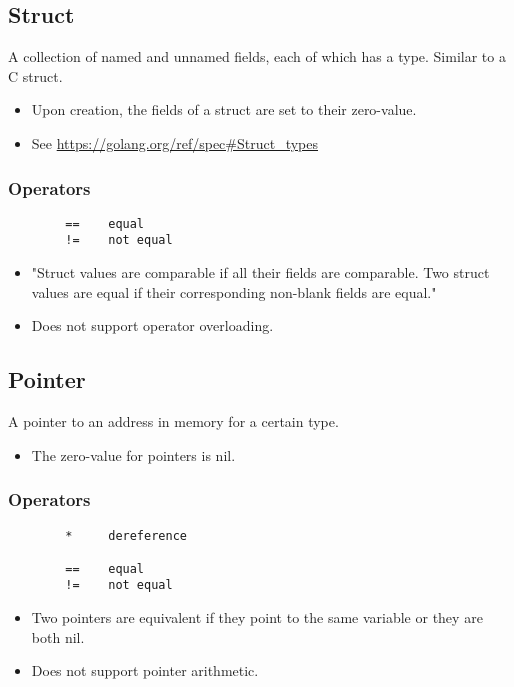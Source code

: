 \documentclass{article}
\begin{document}
	\subsection{Struct}
		A collection of named and unnamed fields, each of which has a type. Similar to a C struct.
		\begin{itemize}
			\item Upon creation, the fields of a struct are set to their zero-value. 
			\item See \url{https://golang.org/ref/spec#Struct_types}
		\end{itemize}
		\subsubsection{Operators}
			\begin{verbatim}
	    ==    equal
	    !=    not equal
			\end{verbatim}
			\begin{itemize}
				\item "Struct values are comparable if all their fields are comparable. Two struct values are equal if their corresponding non-blank fields are equal."
				\item Does not support operator overloading. 
			\end{itemize}
		
	\subsection{Pointer}
		A pointer to an address in memory for a certain type. 
		\begin{itemize}
			\item The zero-value for pointers is \colorbox{code}{nil}. 
		\end{itemize}
		\subsubsection{Operators}
			\begin{verbatim}
	    *     dereference
			
	    ==    equal
	    !=    not equal
			\end{verbatim}
			\begin{itemize}
				\item Two pointers are equivalent if they point to the same variable or they are both \colorbox{code}{nil}. 
				\item Does not support pointer arithmetic.
			\end{itemize}
		
\end{document}
